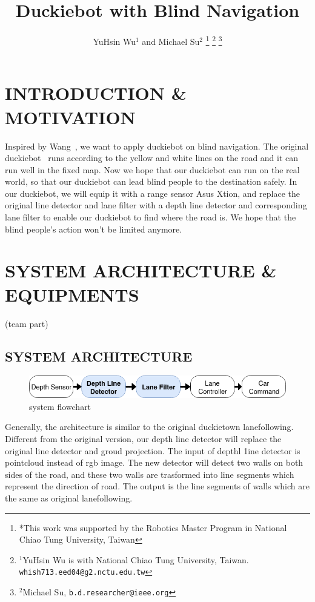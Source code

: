 \documentclass[letterpaper, 10 pt, conference]{ieeeconf}  %
\title{\LARGE \bf
Duckiebot with Blind Navigation
}
\author{YuHsin Wu$^{1}$ and Michael Su$^{2}$%
\thanks{*This work was supported by the Robotics Master Program in National Chiao Tung University, Taiwan}%
\thanks{$^{1}$YuHsin Wu is with National Chiao Tung University, Taiwan.
        {\tt\small whish713.eed04@g2.nctu.edu.tw}}%
\thanks{$^{2}$Michael Su,
        {\tt\small b.d.researcher@ieee.org}}%
}
\begin{document}
\maketitle
\thispagestyle{empty}
\pagestyle{empty}


\section{INTRODUCTION \& MOTIVATION}

Inspired by Wang~\cite{wang2017enabling}, we want to apply duckiebot on blind navigation. The original duckiebot~\cite{paull2017duckietown} runs according to the yellow and white lines on the road and it can run well in the fixed map. Now we hope that our duckiebot can run on the real world, so that our duckiebot can lead blind people to the destination safely. In our duckiebot, we will equip it with a range sensor Asus Xtion, and replace the original line detector and lane filter with a depth line detector and corresponding lane filter to enable our duckiebot to find where the road is. We hope that the blind people's action won't be limited anymore.

\section{SYSTEM ARCHITECTURE \& EQUIPMENTS}

(team part)

\subsection{SYSTEM ARCHITECTURE}
\begin{figure}[h] %
\includegraphics[width=1.0\columnwidth]{system_flowchart.png}
\centering
\caption{system flowchart}
\end{figure}

Generally, the architecture is similar to the original duckietown lanefollowing. Different from the original version, our depth line detector will replace the original line detector and groud projection. The input of depthl 1ine detector is pointcloud instead of rgb image. The new detector will detect two walls on both sides of the road, and these two walls are trasformed into line segments which represent the direction of road. The output is the line segments of walls which are the same as original lanefollowing. 
\end{document}
